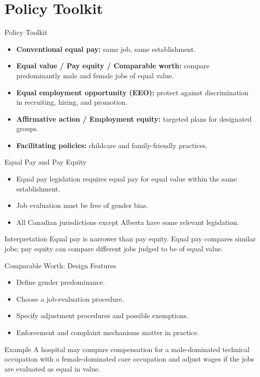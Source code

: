 \documentclass[aspectratio=169]{beamer}
\begin{document}
\section{Policy Toolkit}

\begin{frame}{Policy Toolkit}
\transfade
\begin{itemize}
  \item \textbf{Conventional equal pay:} same job, same establishment.
  \item \textbf{Equal value / Pay equity / Comparable worth:} compare predominantly male and female jobs of equal value.
  \item \textbf{Equal employment opportunity (EEO):} protect against discrimination in recruiting, hiring, and promotion.
  \item \textbf{Affirmative action / Employment equity:} targeted plans for designated groups.
  \item \textbf{Facilitating policies:} childcare and family-friendly practices.
\end{itemize}
\end{frame}



\begin{frame}{Equal Pay and Pay Equity}
\transfade
\begin{itemize}
  \item Equal pay legislation requires equal pay for equal value within the same establishment.
  \item Job evaluation must be free of gender bias.
  \item All Canadian jurisdictions except Alberta have some relevant legislation.
\end{itemize}

\begin{block}{Interpretation}
Equal pay is narrower than pay equity. Equal pay compares similar jobs; pay equity can compare different jobs judged to be of equal value.
\end{block}
\end{frame}

\begin{frame}{Comparable Worth: Design Features}
\transfade
\begin{itemize}
  \item Define gender predominance.
  \item Choose a job-evaluation procedure.
  \item Specify adjustment procedures and possible exemptions.
  \item Enforcement and complaint mechanisms matter in practice.
\end{itemize}

\begin{exampleblock}{Example}
A hospital may compare compensation for a male-dominated technical occupation with a female-dominated care occupation and adjust wages if the jobs are evaluated as equal in value.
\end{exampleblock}
\end{frame}
\end{document}

